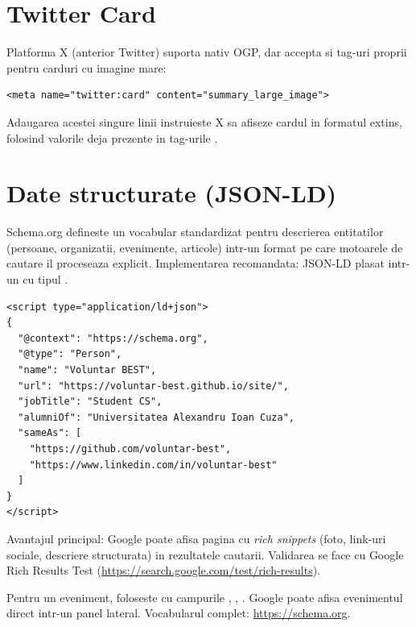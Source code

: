 \section{Twitter Card}

Platforma X (anterior Twitter) suporta nativ OGP, dar accepta si tag-uri proprii pentru carduri cu imagine mare:

\begin{lstlisting}[style=html]
<meta name="twitter:card" content="summary_large_image">
\end{lstlisting}

Adaugarea acestei singure linii instruieste X sa afiseze cardul in formatul extins, folosind valorile deja prezente in tag-urile .

\section{Date structurate (JSON-LD)}

Schema.org defineste un vocabular standardizat pentru descrierea entitatilor (persoane, organizatii, evenimente, articole) intr-un format pe care motoarele de cautare il proceseaza explicit. Implementarea recomandata: JSON-LD plasat intr-un  cu tipul .

\begin{lstlisting}[style=html, caption={Schema Person pentru o pagina personala}]
<script type="application/ld+json">
{
  "@context": "https://schema.org",
  "@type": "Person",
  "name": "Voluntar BEST",
  "url": "https://voluntar-best.github.io/site/",
  "jobTitle": "Student CS",
  "alumniOf": "Universitatea Alexandru Ioan Cuza",
  "sameAs": [
    "https://github.com/voluntar-best",
    "https://www.linkedin.com/in/voluntar-best"
  ]
}
</script>
\end{lstlisting}

Avantajul principal: Google poate afisa pagina cu \emph{rich snippets} (foto, link-uri sociale, descriere structurata) in rezultatele cautarii. Validarea se face cu Google Rich Results Test (\url{https://search.google.com/test/rich-results}).

\begin{ponturi}
Pentru un eveniment, foloseste  cu campurile , , . Google poate afisa evenimentul direct intr-un panel lateral. Vocabularul complet: \url{https://schema.org}.
\end{ponturi}


